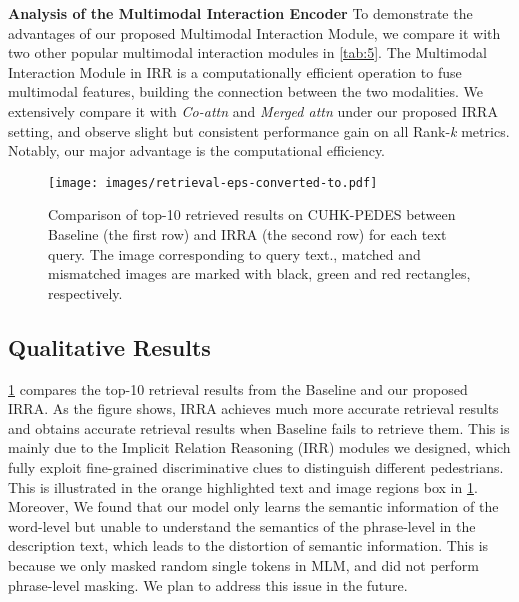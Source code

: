 \documentclass[10pt,twocolumn,letterpaper]{article}
\begin{document}
\textbf{Analysis of the Multimodal Interaction Encoder}
To demonstrate the advantages of our proposed Multimodal Interaction Module, we compare it with two other popular multimodal interaction modules in \cref{tab:5}. The Multimodal Interaction Module in IRR is a computationally efficient operation to fuse multimodal features, building the connection between the two modalities. We extensively compare it with \textit{Co-attn} and \textit{Merged attn} under our proposed IRRA setting, and observe slight but consistent performance gain on all Rank-\textit{k} metrics. Notably, our major advantage is the computational efficiency.

\begin{figure}[ht]
  \centerline{\texttt{[image: images/retrieval-eps-converted-to.pdf]}}
  \caption{Comparison of top-10 retrieved results on CUHK-PEDES between Baseline (the first row) and IRRA (the second row) for each text query. The image corresponding to query text., matched and mismatched images are marked with black, green and red rectangles, respectively.}
  \label{fig5}
  \vspace{-4mm}
\end{figure}

\subsection{Qualitative Results}
\cref{fig5} compares the top-10 retrieval results from the Baseline and our proposed IRRA. As the figure shows, IRRA achieves much more accurate retrieval results and obtains accurate retrieval results when Baseline fails to retrieve them. This is mainly due to the Implicit Relation Reasoning (IRR) modules we designed, which fully exploit fine-grained discriminative clues to distinguish different pedestrians. This is illustrated in the orange highlighted text and image regions box in \cref{fig5}. Moreover, We found that our model only learns the semantic information of the word-level but unable to understand the semantics of the phrase-level in the description text, which leads to the distortion of semantic information. This is because we only masked random single tokens in MLM, and did not perform phrase-level masking. We plan to address this issue in the future.
\end{document}
